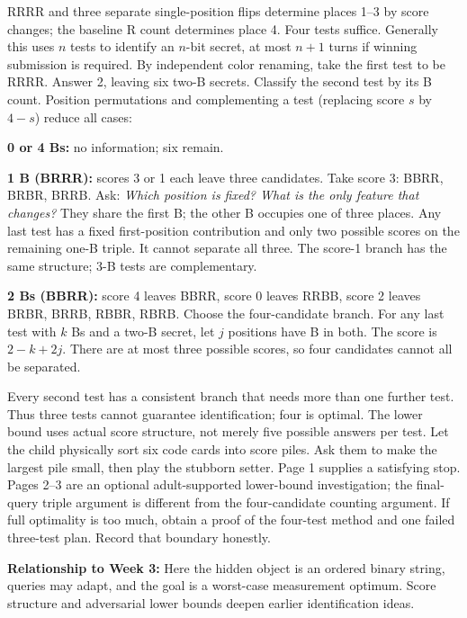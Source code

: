 \documentclass[11pt]{article}
\begin{document}
\newpage
{}
RRRR and three separate single-position flips determine places 1--3 by score changes; the baseline R count determines place 4. Four tests suffice. Generally this uses \(n\) tests to identify an \(n\)-bit secret, at most \(n+1\) turns if winning submission is required.
By independent color renaming, take the first test to be RRRR. Answer 2, leaving six two-B secrets. Classify the second test by its B count. Position permutations and complementing a test (replacing score \(s\) by \(4-s\)) reduce all cases:

\textbf{0 or 4 Bs:} no information; six remain.

\textbf{1 B (BRRR):} scores 3 or 1 each leave three candidates. Take score 3: BBRR, BRBR, BRRB. Ask: \emph{Which position is fixed? What is the only feature that changes?} They share the first B; the other B occupies one of three places. Any last test has a fixed first-position contribution and only two possible scores on the remaining one-B triple. It cannot separate all three. The score-1 branch has the same structure; 3-B tests are complementary.

\textbf{2 Bs (BBRR):} score 4 leaves BBRR, score 0 leaves RRBB, score 2 leaves BRBR, BRRB, RBBR, RBRB. Choose the four-candidate branch. For any last test with \(k\) Bs and a two-B secret, let \(j\) positions have B in both. The score is \(2-k+2j\). There are at most three possible scores, so four candidates cannot all be separated.

Every second test has a consistent branch that needs more than one further test. Thus three tests cannot guarantee identification; four is optimal. The lower bound uses actual score structure, not merely five possible answers per test.
Let the child physically sort six code cards into score piles. Ask them to make the largest pile small, then play the stubborn setter. Page 1 supplies a satisfying stop. Pages 2--3 are an optional adult-supported lower-bound investigation; the final-query triple argument is different from the four-candidate counting argument. If full optimality is too much, obtain a proof of the four-test method and one failed three-test plan. Record that boundary honestly.

\textbf{Relationship to Week 3:} Here the hidden object is an ordered binary string, queries may adapt, and the goal is a worst-case measurement optimum. Score structure and adversarial lower bounds deepen earlier identification ideas.
\end{document}
